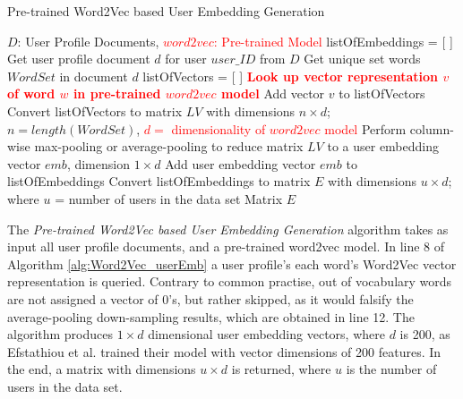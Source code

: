             \begin{algorithm}
            \caption{Pre-trained Word2Vec based User Embedding Generation}
            \label{alg:Word2Vec_userEmb}
            \begin{algorithmic}[1]
                \REQUIRE $D$: User Profile Documents, \textcolor{red}{$word2vec$: Pre-trained Model}
                \STATE listOfEmbeddings = [ ]
                    \STATE Get user profile document $d$ for user $user\_ID$ from $D$
                    \STATE Get unique set words $WordSet$ in document $d$
                    \STATE listOfVectors = [ ]
                    \STATE
                        \STATE \textbf{\textcolor{red}{Look up vector representation $v$ of word $w$ in pre-trained $word2vec$ model}}
                        \STATE Add vector $v$ to listOfVectors
                    \ENDFOR
                    \STATE Convert listOfVectors to matrix $LV$ with dimensions $n \times d$; $n=length(WordSet)$, \textcolor{red}{$d=$ dimensionality of $word2vec$ model}
                    \STATE Perform column-wise max-pooling or average-pooling to reduce matrix $LV$ to a user embedding vector $emb$, dimension $1 \times d$
                    \STATE Add user embedding vector $emb$ to listOfEmbeddings
                \ENDFOR
                \STATE Convert listOfEmbeddings to matrix $E$ with dimensions $u \times d$; where $u$ = number of users in the data set
                \RETURN Matrix $E$
            \end{algorithmic}
            \end{algorithm}
            
             The \emph{Pre-trained Word2Vec based User Embedding Generation} algorithm takes as input all user profile documents, and a pre-trained word2vec model. In line 8 of Algorithm \ref{alg:Word2Vec_userEmb} a user profile's each word's Word2Vec vector representation is queried. Contrary to common practise, out of vocabulary words are not assigned a vector of 0's, but rather skipped, as it would falsify the average-pooling down-sampling results, which are obtained in line 12. The algorithm produces $1 \times d$ dimensional user embedding vectors, where $d$ is 200, as Efstathiou et al. \cite{efstathiou2018word} trained their model with vector dimensions of 200 features. In the end, a matrix with dimensions $u \times d$ is returned, where $u$ is the number of users in the data set.
        
